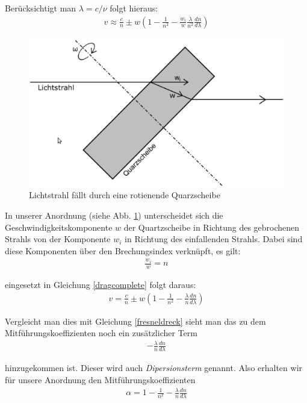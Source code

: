 \documentclass[12pt]{article}
\begin{document}
Berücksichtigt man $\lambda = c/\nu$ folgt hieraus:
\begin{align}
 \label{dragcomplete} v \approx \frac{c}{n} \pm w \left( 1- \frac{1}{n^2} - \frac{w_i}{w} \frac{\lambda}{n^2} \frac{dn}{d\lambda} \right)
\end{align}

\begin{figure}[H]  
\centering
\includegraphics[width=0.9\linewidth]{pictures/abb3.eps}
\caption{Lichtstrahl fällt durch eine rotienende Quarzscheibe}
\label{abb3}
\end{figure}

In unserer Anordnung (siehe Abb. \ref{abb3}) unterscheidet sich die Geschwindigkeitskomponente $w$ der Quartzscheibe in Richtung des gebrochenen Strahls von der Komponente $w_i$ in Richtung des einfallenden Strahls. Dabei sind diese Komponenten über den Brechungsindex verknüpft, es gilt:
\begin{align}
 \frac{w_i}{w}=n
\end{align}

eingesetzt in Gleichung \ref{dragcomplete} folgt daraus:
\begin{align}
 v=\frac{c}{n} \pm w \left(1-\frac{1}{n^2} - \frac{\lambda}{n} \frac{dn}{d\lambda} \right)
\end{align}

Vergleicht man dies mit Gleichung \ref{fresneldreck} sieht man das zu dem Mitführungskoeffizienten noch ein zusätzlicher Term 
\begin{align}
 -\frac{\lambda}{n} \frac{dn}{d\lambda}
\end{align}

hinzugekommen ist. Dieser wird auch \textit{Dipersionsterm} genannt. Also erhalten wir für unsere Anordnung den Mitführungskoeffizienten 
\begin{align}
\label{mitfuehrung} \alpha = 1 - \frac{1}{n^2} - \frac{\lambda}{n} \frac{dn}{d\lambda}
\end{align}
\end{document}
